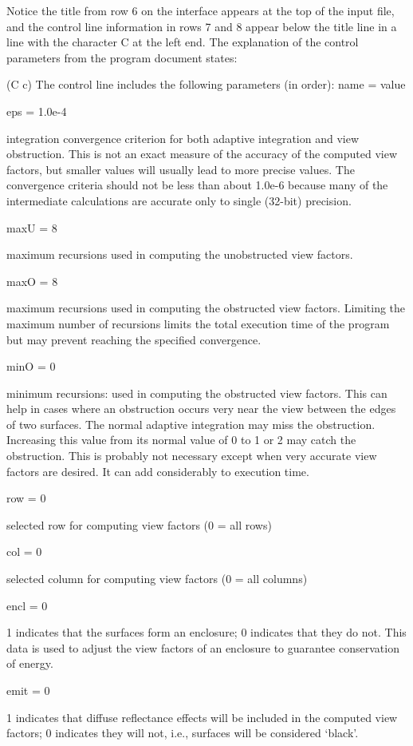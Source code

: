 Notice the title from row 6 on the interface appears at the top of the input file, and the control line information in rows 7 and 8 appear below the title line in a line with the character C at the left end. The explanation of the control parameters from the program document states:

(C c) The control line includes the following parameters (in order): name = value

eps = 1.0e-4

integration convergence criterion for both adaptive integration and view obstruction. This is not an exact measure of the accuracy of the computed view factors, but smaller values will usually lead to more precise values. The convergence criteria should not be less than about 1.0e-6 because many of the intermediate calculations are accurate only to single (32-bit) precision.

maxU = 8

maximum recursions used in computing the unobstructed view factors.

maxO = 8

maximum recursions used in computing the obstructed view factors. Limiting the maximum number of recursions limits the total execution time of the program but may prevent reaching the specified convergence.

minO = 0

minimum recursions: used in computing the obstructed view factors. This can help in cases where an obstruction occurs very near the view between the edges of two surfaces. The normal adaptive integration may miss the obstruction. Increasing this value from its normal value of 0 to 1 or 2 may catch the obstruction. This is probably not necessary except when very accurate view factors are desired. It can add considerably to execution time.

row = 0

selected row for computing view factors (0 = all rows)

col = 0

selected column for computing view factors (0 = all columns)

encl = 0

1 indicates that the surfaces form an enclosure; 0 indicates that they do not. This data is used to adjust the view factors of an enclosure to guarantee conservation of energy.

emit = 0

1 indicates that diffuse reflectance effects will be included in the computed view factors; 0 indicates they will not, i.e., surfaces will be considered `black'.

